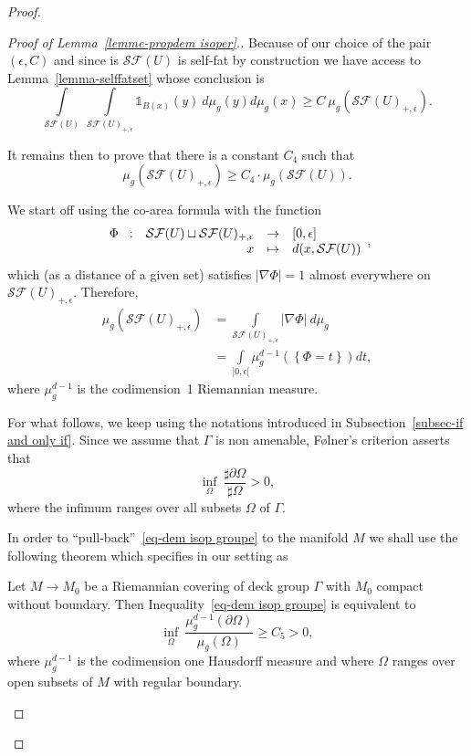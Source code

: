 \documentclass[AHL,Unicode,longabstracts,published]{cedram}
\newcommand{\dsun}{\mathds{1}}
\newcommand{\cSF}{\mathcal{SF}}
\newcommand{\inte}[1]{\underset{#1}{\int}}
\newcommand{\infi}[1]{\underset{#1}{\inf}}
\newcommand{\fonction}[5]{
\begin{array}{r r c l}
#1 \hspace{2mm} : & #2 & \to & #3 \\
& #4 & \mapsto & #5 \\
\end{array}}
\begin{document}
\begin{proof}
\begin{proof}[Proof of Lemma~\ref{lemme-propdem isoper}.]
Because of our choice of the pair $(\epsilon,C)$ and since is $\cSF(U)$ is self-fat by construction we have access to Lemma~\ref{lemma-selffatset} whose conclusion is
\[
\inte{\cSF(U)} \ \inte{\cSF(U)_{+, \epsilon}} \dsun_{B(x)}(y) \ d \mu_g(y) d \mu_g(x) \ge C \ \mu_g\left(\cSF(U)_{+, \epsilon}\right) .
\]

It remains then to prove that there is a constant $C_4$ such that
\[
\mu_g\left(\cSF(U)_{+, \epsilon}\right) \ge C_4 \cdot \mu_g\left(\cSF(U)\right) .
\]

We start off using the co-area formula with the function
\[
\fonction{\Phi}{ \cSF(U) \sqcup \cSF(U)_{+, \epsilon}}{[0, \epsilon]}{x}{d(x, \cSF(U))} ,
\]
which (as a distance of a given set) satisfies $|\nabla \Phi| =1$ almost everywhere on $\cSF(U)_{+, \epsilon}$. Therefore,
\begin{align*}
\mu_g\left(\cSF(U)_{+, \epsilon}\right) & = \inte{\cSF(U)_{+, \epsilon}} |\nabla \Phi| \ d \mu_g \\
& = \inte{]0,\epsilon[} \mu_g^{d-1}\left(\left\{ \Phi =t \right\}\right) dt ,
\end{align*}
where $\mu_g^{d-1}$ is the codimension~1 Riemannian measure.

For what follows, we keep using the notations introduced in Subsection~\ref{subsec-if and only if}. Since we assume that $\Gamma$ is non amenable, F\o lner's criterion asserts that
\begin{equation}\label{eq-dem isop groupe}
\infi{ \Omega} \ \frac{ \sharp \partial \Omega }{ \sharp \Omega} > 0 ,
\end{equation}
where the infimum ranges over all subsets $\Omega$ of $\Gamma$.

In order to ``pull-back''~\eqref{eq-dem isop groupe} to the manifold $M$ we shall use the following theorem which specifies in our setting as

\begin{theo}\label{theo-isopersaloff}
Let $M \to M_0$ be a Riemannian covering of deck group $\Gamma$ with $M_0$ compact without boundary. Then Inequality~\eqref{eq-dem isop groupe} is equivalent to
\[
\infi{ \Omega} \ \frac{ \mu_g^{d-1}(\partial \Omega)}{\mu_g(\Omega)} \ge C_5 > 0 ,
\]
where $\mu_g^{d-1}$ is the codimension one Hausdorff measure and where $\Omega$ ranges over open subsets of $M$ with regular boundary.
\end{theo}


\end{proof}
\end{proof}
\end{document}
